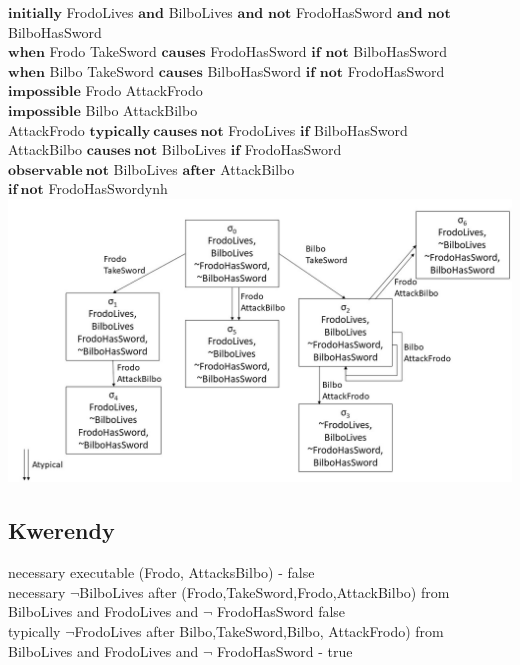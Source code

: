 \documentclass[11pt,a4paper]{article}
\begin{document}
    \begin{center}
    $\mathbf{initially}$ FrodoLives $\mathbf{and}$ BilboLives $\mathbf{and}$ $\mathbf{not}$ FrodoHasSword $\mathbf{and}$ $\mathbf{not}$ BilboHasSword\\
    
    $\mathbf{when}$ Frodo TakeSword $\mathbf{causes}$ FrodoHasSword $\mathbf{if}$ $\mathbf{not}$ BilboHasSword\\
    
    $\mathbf{when}$ Bilbo TakeSword $\mathbf{causes}$ BilboHasSword $\mathbf{if}$ $\mathbf{not}$ FrodoHasSword\\
    
    $\mathbf{impossible}$ Frodo AttackFrodo\\
    
    $\mathbf{impossible}$ Bilbo AttackBilbo\\
    
    AttackFrodo $\mathbf{typically} ~ \mathbf{causes~not}$ FrodoLives $\mathbf{if}$ BilboHasSword\\
    
    AttackBilbo $\mathbf{causes~not}$ BilboLives $\mathbf{if}$ FrodoHasSword\\
    
    $\mathbf{observable~not}$ BilboLives $\mathbf{after}$ AttackBilbo\\ $\mathbf{if~not}$ FrodoHasSwordynh
    \includegraphics[width=\textwidth]{resources/graf.jpg} 
    \end{center}
 

\newpage
\subsection{Kwerendy}
necessary executable (Frodo, AttacksBilbo) - false \\
necessary $\neg$BilboLives after ({Frodo,TakeSword},{Frodo,AttackBilbo}) from BilboLives and FrodoLives  and $\neg$ FrodoHasSword false\\
typically $\neg$FrodoLives after {Bilbo,TakeSword},{Bilbo, AttackFrodo}) from BilboLives and FrodoLives and $\neg$ FrodoHasSword - true\\
\newpage
\end{document}
